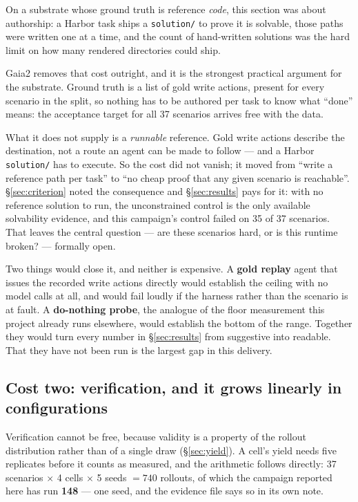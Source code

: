 \documentclass[11pt,a4paper]{article}
\begin{document}
On a substrate whose ground truth is reference \emph{code}, this section was about authorship: a Harbor task ships a \texttt{solution/} to prove it is solvable, those paths were written one at a time, and the count of hand-written solutions was the hard limit on how many rendered directories could ship.

Gaia2 removes that cost outright, and it is the strongest practical argument for the substrate. Ground truth is a list of gold write actions, present for every scenario in the split, so nothing has to be authored per task to know what ``done'' means: the acceptance target for all 37 scenarios arrives free with the data.

What it does not supply is a \emph{runnable} reference. Gold write actions describe the destination, not a route an agent can be made to follow --- and a Harbor \texttt{solution/} has to execute. So the cost did not vanish; it moved from ``write a reference path per task'' to ``no cheap proof that any given scenario is reachable''. \S\ref{sec:criterion} noted the consequence and \S\ref{sec:results} pays for it: with no reference solution to run, the unconstrained control is the only available solvability evidence, and this campaign's control failed on 35 of 37 scenarios. That leaves the central question --- are these scenarios hard, or is this runtime broken? --- formally open.

Two things would close it, and neither is expensive. A \textbf{gold replay} agent that issues the recorded write actions directly would establish the ceiling with no model calls at all, and would fail loudly if the harness rather than the scenario is at fault. A \textbf{do-nothing probe}, the analogue of the floor measurement this project already runs elsewhere, would establish the bottom of the range. Together they would turn every number in \S\ref{sec:results} from suggestive into readable. That they have not been run is the largest gap in this delivery.

\subsection{Cost two: verification, and it grows linearly in configurations}

Verification cannot be free, because validity is a property of the rollout distribution rather than of a single draw (\S\ref{sec:yield}). A cell's yield needs five replicates before it counts as measured, and the arithmetic follows directly: 37 scenarios $\times$ 4 cells $\times$ 5 seeds $=740$ rollouts, of which the campaign reported here has run \textbf{148} --- one seed, and the evidence file says so in its own note.
\end{document}
